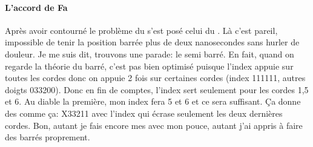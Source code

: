 \documentclass[versionenligne]{framabook}
\begin{document}
\paragraph{L'accord de Fa}
Après avoir contourné le problème du  s'est posé celui du
. Là c'est pareil, impossible de tenir la position barrée
plus de deux nanosecondes sans hurler de douleur.  Je me suis dit,
trouvons une parade: le semi barré.  En fait, quand on regarde la
théorie du barré, c'est pas bien optimisé puisque l'index appuie sur
toutes les cordes donc on appuie 2 fois sur certaines cordes (index
111111, autres doigts 033200). Donc en fin de comptes, l'index sert
seulement pour les cordes 1,5 et 6. Au diable la première, mon index
fera 5 et 6 et ce sera suffisant.  Ça donne des  comme ça: X33211
avec l'index qui écrase seulement les deux dernières cordes. Bon,
autant je fais encore mes  avec mon pouce, autant j'ai appris à
faire des barrés proprement.
\end{document}
